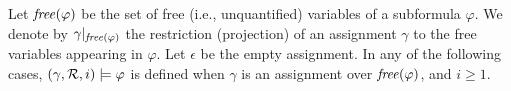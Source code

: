 Let $\mathit{free} ( \varphi )$ be the set of free (i.e., unquantified) variables of a
subformula $\varphi$. 
We denote by $\gamma |_{\mathit{free} ( \varphi )}$ the restriction (projection) of
an assignment $\gamma$ to the free variables appearing in $\varphi$.
%
Let $\epsilon$ be the empty assignment. 
%
In any of the following cases, $( \gamma,  {\cal R} , i ) \models \varphi$
is defined when $\gamma$ is an
assignment over $\mathit{free} ( \varphi )$, and $i\ge 1$.

